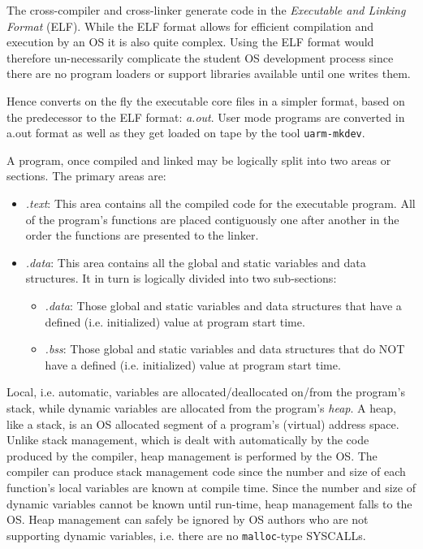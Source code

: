 The cross-compiler and cross-linker generate code in the \emph{Executable and Linking Format} (ELF). 
While the ELF format allows for efficient compilation and execution by an OS it is also quite complex. 
Using the ELF format would therefore un-necessarily complicate the student OS development process since there are no program loaders or support libraries available until one writes them.

Hence \uarm{} converts on the fly the executable core files in a simpler format, based on the predecessor to the ELF format: \emph{a.out}.
User mode programs are converted in a.out format as well as they get loaded on tape by the tool \texttt{uarm-mkdev}.

A program, once compiled and linked may be logically split into two areas or sections. 
The primary areas are:
\begin{itemize}
	\item \emph{.text}: This area contains all the compiled code for the executable program.
		All of the program’s functions are placed contiguously one after another in the order the functions are presented to the linker.
	\item \emph{.data}: This area contains all the global and static variables and data structures. 
		It in turn is logically divided into two sub-sections:
		\begin{itemize}
			\item \emph{.data}: Those global and static variables and data structures that have a defined (i.e. initialized) value at program start time.
			\item \emph{.bss}: Those global and static variables and data structures that do NOT have a defined (i.e. initialized) value at program start time.
		\end{itemize}
\end{itemize}

Local, i.e. automatic, variables are allocated/deallocated on/from the program’s stack, while dynamic variables are allocated from the program’s \emph{heap}.
A heap, like a stack, is an OS allocated segment of a program’s (virtual) address space.
Unlike stack management, which is dealt with automatically by the code produced by the compiler, heap management is performed by the OS. 
The compiler can produce stack management code since the number and size of each function’s local variables are known at compile time. 
Since the number and size of dynamic variables cannot be known until run-time, heap management falls to the OS. 
Heap management can safely be ignored by OS authors who are not supporting dynamic variables, i.e. there are no \texttt{malloc}-type SYSCALLs.

